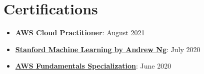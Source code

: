 \documentclass[letterpaper,11pt]{article}
\newcommand{\resumeItem}[2]{
  \item\small{
    \textbf{#1}{: #2 \vspace{-2pt}}
  }
}
\newcommand{\resumeSubHeadingListStart}{\begin{itemize}[leftmargin=*]}
\newcommand{\resumeSubHeadingListEnd}{\end{itemize}}
\begin{document}
\section{Certifications}
 \resumeSubHeadingListStart
   \resumeItem{\href{https://www.credly.com/badges/c8d7f47f-c6c1-4af9-8391-5b509b92b271}{AWS Cloud Practitioner}}
     {August 2021}
   \resumeItem{\href{https://coursera.org/share/29802cca497e8680b26b241d0ef50b59}{Stanford Machine Learning by Andrew Ng}}
     {July 2020}
   \resumeItem{\href{https://coursera.org/share/daef661212dab251985d69e4fb71f730}{AWS Fundamentals Specialization}}
     {June 2020}
 \resumeSubHeadingListEnd

\end{document}
